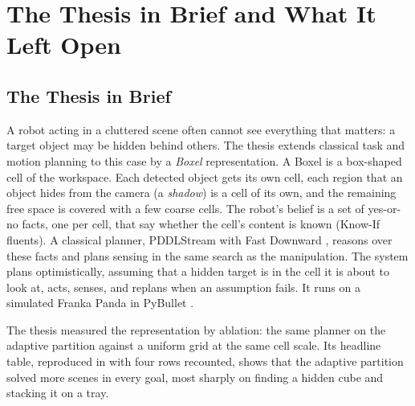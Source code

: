
\chapter{The Thesis in Brief and What It Left Open}
\label{ch:thesis-recap}

\section{The Thesis in Brief}
\label{sec:thesis-brief}

A robot acting in a cluttered scene often cannot see everything that matters: a
target object may be hidden behind others. The thesis \cite{alassiri2026thesis}
extends classical task and motion planning to this case by a \emph{Boxel}
representation. A Boxel is a box-shaped cell of the workspace. Each detected
object gets its own cell, each region that an object hides from the camera (a
\emph{shadow}) is a cell of its own, and the remaining free space is covered with
a few coarse cells. The robot's belief is a set of yes-or-no facts, one per cell,
that say whether the cell's content is known (Know-If fluents). A classical
planner, PDDLStream \cite{garrett2018pddlstream} with Fast Downward
\cite{helmert2006fast}, reasons over these facts and plans sensing in the same
search as the manipulation. The system plans optimistically, assuming that a
hidden target is in the cell it is about to look at, acts, senses, and replans
when an assumption fails. It runs on a simulated Franka Panda in PyBullet
\cite{coumans2021pybullet}.

The thesis measured the representation by ablation: the same planner on the
adaptive partition against a uniform grid at the same cell scale. Its headline
table, reproduced in  with four rows recounted, shows that the adaptive
partition solved more scenes in every goal, most sharply on finding a hidden
cube and stacking it on a tray.

